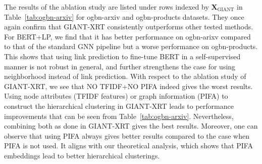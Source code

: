 \documentclass{article} %
\begin{document}
The results of the ablation study are listed under rows indexed by $\mathbf{X}_{\text{GIANT}}$ in Table~\ref{tab:ogbn-arxiv} for ogbn-arxiv and ogbn-products datasets. They once again confirm that GIANT-XRT consistently outperforms other tested methods. For BERT+LP, we find that it has better performance on ogbn-arixv compared to that of the standard GNN pipeline but a worse performance on ogbn-products. This shows that using link prediction to fine-tune BERT in a self-supervised manner is not robust in general, and further strengthens the case for using neighborhood instead of link prediction. With respect to the ablation study of GIANT-XRT, we see that NO TFIDF+NO PIFA indeed gives the worst results. Using node attributes (TFIDF features) or graph information (PIFA) to construct the hierarchical clustering in GIANT-XRT leads to performance improvements that can be seen from Table~\ref{tab:ogbn-arxiv}. Nevertheless, combining both as done in GIANT-XRT gives the best results. Moreover, one can observe that using PIFA always gives better results compared to the case when PIFA is not used. It aligns with our theoretical analysis, which shows that PIFA embeddings lead to better hierarchical clusterings.



\end{document}
